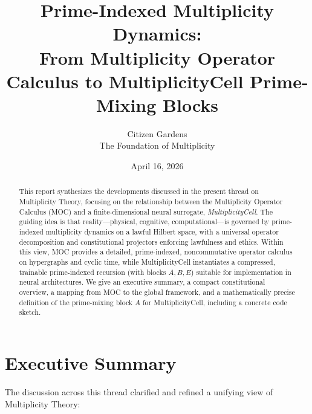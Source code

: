 \documentclass[11pt]{article}
\title{Prime-Indexed Multiplicity Dynamics:\\
From Multiplicity Operator Calculus to MultiplicityCell Prime-Mixing Blocks}
\author{Citizen Gardens \\ The Foundation of Multiplicity}
\date{April 16, 2026}
\begin{document}
\maketitle

\begin{abstract}
This report synthesizes the developments discussed in the present thread on
Multiplicity Theory, focusing on the relationship between the Multiplicity
Operator Calculus (MOC) and a finite-dimensional neural surrogate,
\emph{MultiplicityCell}. The guiding idea is that reality---physical,
cognitive, computational---is governed by prime-indexed multiplicity dynamics
on a lawful Hilbert space, with a universal operator decomposition and
constitutional projectors enforcing lawfulness and ethics. Within this view,
MOC provides a detailed, prime-indexed, noncommutative operator calculus on
hypergraphs and cyclic time, while MultiplicityCell instantiates a compressed,
trainable prime-indexed recursion (with blocks \(A,B,E\)) suitable for
implementation in neural architectures. We give an executive summary, a
compact constitutional overview, a mapping from MOC to the global framework,
and a mathematically precise definition of the prime-mixing block \(A\) for
MultiplicityCell, including a concrete code sketch.
\end{abstract}
\newpage
\tableofcontents
\newpage
\section{Executive Summary}

The discussion across this thread clarified and refined a unifying view of
Multiplicity Theory:
\end{document}
